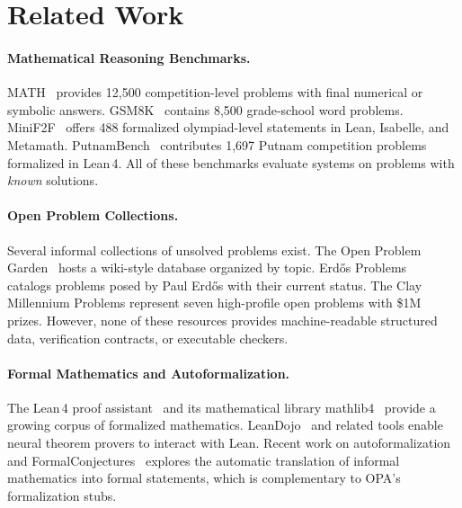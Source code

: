 \documentclass[11pt]{article}
\begin{document}
\section{Related Work}
\label{sec:related}

\paragraph{Mathematical Reasoning Benchmarks.}
MATH~\citep{hendrycks2021math} provides 12{,}500 competition-level problems with final numerical or symbolic answers.
GSM8K~\citep{cobbe2021gsm8k} contains 8{,}500 grade-school word problems.
MiniF2F~\citep{zheng2022minif2f} offers 488 formalized olympiad-level statements in Lean, Isabelle, and Metamath.
PutnamBench~\citep{tsoukalas2024putnambench} contributes 1{,}697 Putnam competition problems formalized in Lean\,4.
All of these benchmarks evaluate systems on problems with \emph{known} solutions.

\paragraph{Open Problem Collections.}
Several informal collections of unsolved problems exist.
The Open Problem Garden~\citep{openproblemgarden} hosts a wiki-style database organized by topic.
Erd\H{o}s Problems~\citep{erdosproblems} catalogs problems posed by Paul Erd\H{o}s with their current status.
The Clay Millennium Problems represent seven high-profile open problems with \$1M prizes.
However, none of these resources provides machine-readable structured data, verification contracts, or executable checkers.

\paragraph{Formal Mathematics and Autoformalization.}
The Lean\,4 proof assistant~\citep{moura2021lean4} and its mathematical library mathlib4~\citep{mathlib2020} provide a growing corpus of formalized mathematics.
LeanDojo~\citep{yang2024leandojo} and related tools enable neural theorem provers to interact with Lean.
Recent work on autoformalization~\citep{wu2022autoformalization} and FormalConjectures~\citep{glazer2024formalconjectures} explores the automatic translation of informal mathematics into formal statements, which is complementary to OPA's formalization stubs.

\end{document}
